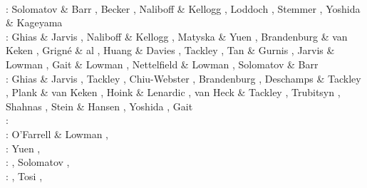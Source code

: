 \begin{scriptsize}
                  \cite{mczh05b}\cite{vary05}
                  \cite{nata05}\cite{nabu05}
                  \cite{chob05}\cite{phbu05}
                  \cite{hosh05}\\
\twothousandsix: Solomatov \& Barr \cite{soba06}, Becker \cite{beck06}, Naliboff \& Kellogg \cite{nake06},
                 Loddoch \etal \cite{losh06}, Stemmer \etal \cite{sthh06}, Yoshida \& Kageyama \cite{yoka06}\\
\twothousandseven: Ghias \& Jarvis \cite{ghja07}, Naliboff \& Kellogg \cite{nake07}, 
                   Matyska \& Yuen \cite{mayu07}, Brandenburg \& van Keken \cite{brva07a,brva07b},
                   Grign\'e \& al \cite{grlt07,grlt07b}, Huang \& Davies \cite{huda07},
                   Tackley \etal \cite{tanh07}, Tan \& Gurnis \cite{tagu07}, 
                   Jarvis \& Lowman \cite{jalo07}, Gait \& Lowman \cite{galo07,galo07b}, 
                   Nettelfield \& Lowman \cite{nelo07}, Solomatov \& Barr \cite{soba07}\\
\twothousandeight: Ghias \& Jarvis \cite{ghja08}, Tackley \cite{tack08,tack08b},
                   Chiu-Webster \etal \cite{chhl08}, Brandenburg \etal \cite{brhv08},
                   Deschamps \& Tackley \cite{deta08}, Plank \& van Keken \cite{plva08},
                   Hoink \& Lenardic \cite{hole08}, van Heck \& Tackley \cite{vata08},
                   Trubitsyn \etal \cite{trkr08}, Shahnas \etal \cite{shlj08},
                   Stein \& Hansen \cite{stha08}, Yoshida \cite{yosh08}, Gait \etal \cite{galg08}\\
\twothousandnine: \cite{wodd09}\cite{fobe09}\cite{gows09}\cite{deta09}\cite{onlj09}\cite{wazh09}\cite{vavv09}
      \cite{brha09}\cite{scbs09b}\cite{oebm09}\cite{fuog09}\\
\twothousandten: O'Farrell \& Lowman \cite{oflo10}, \cite{bumb10}
                 \cite{detn10}\cite{yayh10}
                 \cite{nata10}\cite{hole10}
                 \cite{zhzl10}\cite{vayb10}
                 \cite{brmw10}\\
\twothousandeleven: Yuen \etal \cite{yutc11}, \cite{lowm11}
                    \cite{rota11}\cite{woda11}
                    \cite{lemj11}\cite{befa11}
                    \cite{pewb11}\\
\twothousandtwelve: \cite{bisa12}\cite{cort12b}
                    \cite{deyt12}, Solomatov \cite{solo12}, \cite{wele12}\\
\twothousandthirteen: \cite{holj13}\cite{dadb13}, 
                      Tosi \etal \cite{toyd13}, \cite{bogs13a}
                      \cite{busa13}\cite{mika13}

\end{scriptsize}
